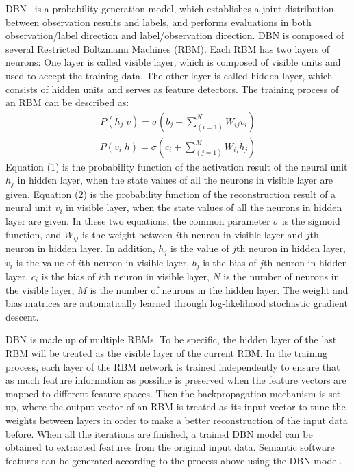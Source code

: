 \documentclass[journal]{IEEEtran}
\begin{document}
DBN~\cite{hinton2006fast} is a probability generation model, which establishes a joint distribution between observation results and labels, and performs evaluations in both observation/label direction and label/observation direction. DBN is composed of several Restricted Boltzmann Machines (RBM). Each RBM has two layers of neurons: One layer is called visible layer, which is composed of visible units and used to accept the training data. The other layer is called hidden layer, which consists of hidden units and serves as feature detectors. The training process of an RBM can be described as:
\begin{eqnarray}
P(h_{j}|v)=\sigma(b_{j}+\sum_{(i=1)}^{N}W_{ij}v_{i})
\end{eqnarray}
\begin{eqnarray}
P(v_{i}|h)=\sigma(c_{i}+\sum_{(j=1)}^{M}W_{ij}h_{j})
\end{eqnarray}
Equation (1) is the probability function of the activation result of the neural unit $h_{j}$ in hidden layer, when the state values of all the neurons in visible layer are given. Equation (2) is the probability function of the reconstruction result of a neural unit $v_{i}$ in visible layer, when the state values of all the neurons in hidden layer are given. In these two equations, the common parameter $\sigma$ is the sigmoid function, and $W_{ij}$ is the weight between $i$th neuron in visible layer and $j$th neuron in hidden layer. In addition, $h_{j}$ is the value of $j$th neuron in hidden layer, $v_{i}$ is the value of $i$th neuron in visible layer, $b_{j}$ is the bias of $j$th neuron in hidden layer, $c_{i}$ is the bias of $i$th neuron in visible layer, $N$ is the number of neurons in the visible layer, $M$ is the number of neurons in the hidden layer. The weight and bias matrices are automatically learned through log-likelihood stochastic gradient descent.


DBN is made up of multiple RBMs. To be specific, the hidden layer of the last RBM will be treated as the visible layer of the current RBM. In the training process, each layer of the RBM network is trained independently to ensure that as much feature information as possible is preserved when the feature vectors are mapped to different feature spaces. Then the backpropagation mechanism is set up, where the output vector of an RBM is treated as its input vector to tune the weights between layers in order to make a better reconstruction of the input data before. When all the iterations are finished, a trained DBN model can be obtained to extracted features from the original input data. Semantic software features can be generated according to the process above using the DBN model.
\end{document}
